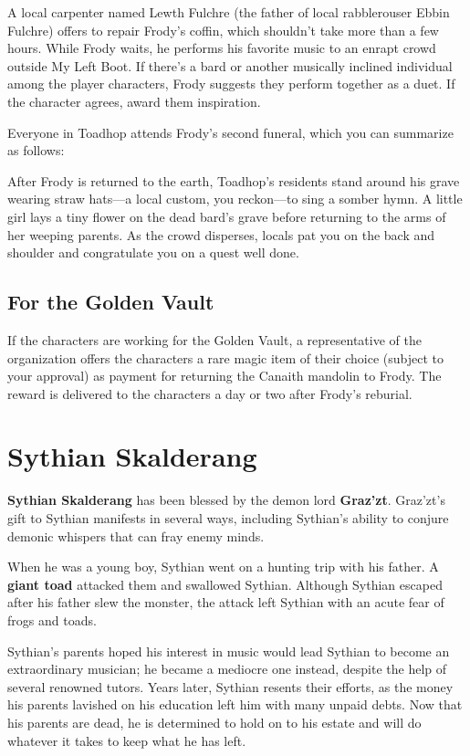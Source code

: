 \documentclass[10pt,a4paper,twoside,bg=print,twocolumn,openany,nodeprecatedcode]{dndbook}
\begin{document}
A local carpenter named Lewth Fulchre (the father of local rabblerouser Ebbin Fulchre) offers to repair Frody's coffin, which shouldn't take more than a few hours. While Frody waits, he performs his favorite music to an enrapt crowd outside My Left Boot. If there's a bard or another musically inclined individual among the player characters, Frody suggests they perform together as a duet. If the character agrees, award them inspiration.

Everyone in Toadhop attends Frody's second funeral, which you can summarize as follows:

\begin{DndReadAloud}{}
After Frody is returned to the earth, Toadhop's residents stand around his grave wearing straw hats—a local custom, you reckon—to sing a somber hymn. A little girl lays a tiny flower on the dead bard's grave before returning to the arms of her weeping parents. As the crowd disperses, locals pat you on the back and shoulder and congratulate you on a quest well done.

\end{DndReadAloud}

\subsection{For the Golden Vault}
If the characters are working for the Golden Vault, a representative of the organization offers the characters a rare magic item of their choice (subject to your approval) as payment for returning the Canaith mandolin to Frody. The reward is delivered to the characters a day or two after Frody's reburial.

\section{Sythian Skalderang}
\textbf{Sythian Skalderang} has been blessed by the demon lord \textbf{Graz'zt}. Graz'zt's gift to Sythian manifests in several ways, including Sythian's ability to conjure demonic whispers that can fray enemy minds.

When he was a young boy, Sythian went on a hunting trip with his father. A \textbf{giant toad} attacked them and swallowed Sythian. Although Sythian escaped after his father slew the monster, the attack left Sythian with an acute fear of frogs and toads.

Sythian's parents hoped his interest in music would lead Sythian to become an extraordinary musician; he became a mediocre one instead, despite the help of several renowned tutors. Years later, Sythian resents their efforts, as the money his parents lavished on his education left him with many unpaid debts. Now that his parents are dead, he is determined to hold on to his estate and will do whatever it takes to keep what he has left.
\end{document}
